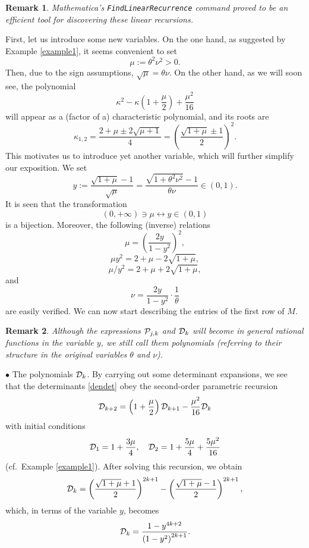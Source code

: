 \documentclass[a4paper]{article}
\newtheorem{remark}{Remark}
\newcommand{\te}{\theta}
\newcommand{\cP}{{\cal{P}}}
\newcommand{\cD}{{\cal{D}}}
\begin{document}
\begin{remark}
 \textit{Mathematica}'s  {\tt{FindLinearRecurrence}} command proved to be an efficient tool for discovering these linear recursions. 
\end{remark}
First, let us introduce some new variables. On the one hand, as suggested by Example \ref{example1}, it seems convenient to set
\[
\mu:=\te^2\nu^2>0.
\]
Then, due to the sign assumptions, $\sqrt{\mu}=\te\nu$. On the other hand, as we will soon see, the polynomial 
\[
\kappa ^2-\kappa  \left(1+\frac{\mu }{2}\right)+\frac{\mu ^2}{16}
\]
will appear as a (factor of a) characteristic polynomial, and its roots are
\begin{equation}\label{kappa12}
\kappa_{1,2}=\frac{2+\mu \pm 2 \sqrt{\mu +1}}{4}=\left(\frac{\sqrt{1+\mu}\pm 1}{2}\right)^2.
\end{equation}
This motivates us to introduce yet another variable, which will further simplify our exposition. We set
\begin{equation}\label{ydef01}
y:=\frac{\sqrt{1+\mu}-1}{\sqrt{\mu}}=\frac{\sqrt{1+\te^2\nu^2}-1}{\te\nu}\in (0,1).
\end{equation}
It is seen that the transformation
\[
(0,+\infty)\ni\mu \longleftrightarrow y\in(0,1)
\]
is a bijection. Moreover, the following (inverse) relations 
\[
\mu=\left(\frac{2y}{1-y^2}\right)^2,
\]
\[\mu y^2=2+\mu-2\sqrt{1+\mu},\]
\[\mu/y^2=2+\mu+2\sqrt{1+\mu},\]
and
\begin{equation}\label{fromytonu}
\nu=\frac{2y}{1-y^2}\cdot\frac{1}{\te}
\end{equation}
are easily verified. We can now start describing the entries of the first row of $M$.
\begin{remark}
Although the expressions $\cP_{j,k}$ and $\cD_{k}$ will become in general rational functions in the variable $y$, we still call them polynomials (referring to their structure in the original variables $\te$ and $\nu$). 
\end{remark}
$\bullet$ The polynomials $\cD_k$. By carrying out some determinant expansions, we see that the determinants \eqref{dendet} obey the second-order parametric recursion
\begin{equation}\label{Dkrec}
\cD_{k+2}=\left(1+\frac{\mu}{2}\right)\cD_{k+1}-\frac{\mu^2}{16}\cD_k
\end{equation}
with initial conditions
\[
\cD_1=1+\frac{3\mu}{4}, \quad \cD_2=1+\frac{5\mu}{4}+\frac{5\mu^2}{16}
\]
(cf.~Example \ref{example1}). After solving this recursion, we obtain
\[
\cD_k=\left(\frac{\sqrt{1+\mu}+1}{2}\right)^{2 k+1}- \left(\frac{\sqrt{1+\mu}-1}{2}\right)^{2 k+1},
\]
which, in terms of the variable $y$, becomes
\begin{equation}\label{expldet}
\cD_k=\frac{1-y^{4 k+2}}{\left(1-y^2\right)^{2 k+1} }.
\end{equation}
\end{document}
